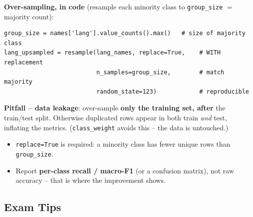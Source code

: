 \documentclass[10pt,a4paper]{article}
\begin{document}
	\textbf{Over-sampling, in code} (resample each minority class to \texttt{group\_size} $=$ majority count):
\begin{verbatim}
group_size = names['lang'].value_counts().max()   # size of majority class
lang_upsampled = resample(lang_names, replace=True,    # WITH replacement
                          n_samples=group_size,        # match majority
                          random_state=123)            # reproducible
\end{verbatim}

	\begin{importantbox}
		\textbf{Pitfall -- data leakage}: over-sample \textbf{only the training set, after} the train/test split. Otherwise duplicated rows appear in both train \emph{and} test, inflating the metrics. (\texttt{class\_weight} avoids this -- the data is untouched.)
	\end{importantbox}
	\begin{itemize}[leftmargin=*]
		\item \texttt{replace=True} is required: a minority class has fewer unique rows than \texttt{group\_size}.
		\item Report \textbf{per-class recall / macro-F1} (or a confusion matrix), not raw accuracy -- that is where the improvement shows.
	\end{itemize}

	\subsection{Exam Tips}
\end{document}
